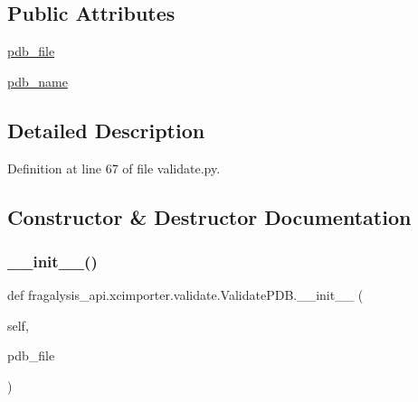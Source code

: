 \subsection*{Public Attributes}
\begin{DoxyCompactItemize}
\item 
\hyperlink{classfragalysis__api_1_1xcimporter_1_1validate_1_1_validate_p_d_b_a9c42b0ed963d65498056ac184793b0f0}{pdb\+\_\+file}
\item 
\hyperlink{classfragalysis__api_1_1xcimporter_1_1validate_1_1_validate_p_d_b_a00933241a00b230d44e1c90155a797d6}{pdb\+\_\+name}
\end{DoxyCompactItemize}


\subsection{Detailed Description}


Definition at line 67 of file validate.\+py.



\subsection{Constructor \& Destructor Documentation}
\mbox{\label{classfragalysis__api_1_1xcimporter_1_1validate_1_1_validate_p_d_b_a2b688d0708ea4b2c01e2c436ff11b8b5}} 
\subsubsection{\texorpdfstring{\+\_\+\+\_\+init\+\_\+\+\_\+()}{\_\_init\_\_()}}
{\footnotesize\ttfamily def fragalysis\+\_\+api.\+xcimporter.\+validate.\+Validate\+P\+D\+B.\+\_\+\+\_\+init\+\_\+\+\_\+ (\begin{DoxyParamCaption}\item[{}]{self,  }\item[{}]{pdb\+\_\+file }\end{DoxyParamCaption})}



